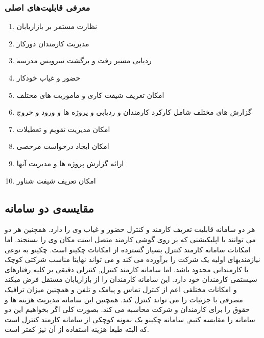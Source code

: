 \subsubsection{معرفی قابلیت‌های اصلی}

\begin{enumerate}
\item 
 نظارت مستمر بر بازاریابان
 \item
  مدیریت کارمندان دورکار
  \item
   ردیابی مسیر رفت و برگشت سرویس مدرسه
   \item
    حضور  و غیاب خودکار
    \item
     امکان تعریف شیفت کاری و ماموریت های مختلف
     \item
      گزارش های مختلف شامل کارکرد کارمندان و ردیابی و پروژه ها و ورود و خروج
      \item
       امکان مدیریت تقویم و تعطیلات
       \item
        امکان ایجاد درخواست مرخصی
        \item
         ارائه گزارش پروژه ها و مدیریت آنها
         \item
          امکان تعریف شیفت شناور
\end{enumerate}


\subsection{مقایسه‌ی دو سامانه}
هر دو سامانه قابلیت تعریف کارمند و کنترل حضور و غیاب وی را دارد. همچنین هر دو می توانند با اپلیکیشنی که بر روی گوشی کارمند متصل است مکان وی را بسنجند. اما امکانات سامانه کارمند کنترل بسیار گسترده از امکانات چکینو است. چکینو به نوعی نیازمندیهای اولیه یک شرکت را برآورده می کند و می تواند نهایتا مناسب شرکتی کوچک با کارمندانی محدود باشد. اما سامانه کارمند کنترل, کنترلی دقیقی بر کلیه رفتارهای سیستمی کارمندان خود دارد. این سامانه کارمندان را از بازاریابان مستقل فرض میکند و امکانات مختلفی اعم از کنترل تماس و پیامک و تلفن و همچنین میزان ترافیک مصرفی با جزئیات را می تواند کنترل کند. همچنین این سامانه مدیریت هزینه ها و حقوق را برای کارمندان و شرکت محاسبه می کند.
بصورت کلی اگر بخواهیم این دو سامانه را مقایسه کنیم, سامانه چکینو یک نمونه کوچکی از سامانه کارمند کنترل است که البته طبعا هزینه استفاده از آن نیز کمتر است.


